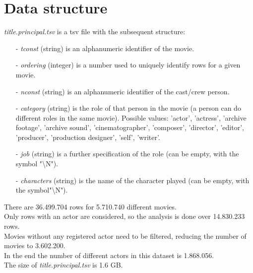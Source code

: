 \documentclass[14pt]{extarticle}
\begin{document}
\section{Data structure}
{\it title.principal.tsv} is a tsv file with the subsequent structure:
\begin{itemize}[leftmargin=*]
\vspace{-0.4cm}\item[-]{\it tconst} (string) is an alphanumeric identifier of the movie.
\vspace{-0.4cm}\item[-]{\it ordering} (integer) is a number used to uniquely identify rows for a given movie.
\vspace{-0.4cm}\item[-]{\it nconst} (string) is an alphanumeric identifier of the cast/crew person.
\vspace{-0.4cm}\item[-]{\it category} (string) is the role of that person in the movie (a person can do different roles in the same movie). Possible values: 'actor', 'actress', 'archive footage', 'archive sound', 'cinematographer', 'composer', 'director', 'editor', 'producer', 'production designer', 'self', 'writer'.
\vspace{-0.4cm}\item[-]{\it job} (string) is a further specification of the role (can be empty, with the symbol "\textbackslash N").
\vspace{-0.4cm}\item[-]{\it characters} (string) is the name of the character played (can be empty, with the symbol"\textbackslash N").
\end{itemize}
There are 36.499.704 rows for 5.710.740 different movies.\\
Only rows with an actor are considered, so the analysis is done over 14.830.233 rows.\\
Movies without any registered actor need to be filtered, reducing the number of movies to 3.602.200.\\
In the end the number of different actors in this dataset is 1.868.056.\\
The size of {\it title.principal.tsv} is 1.6 GB.\\
\end{document}
